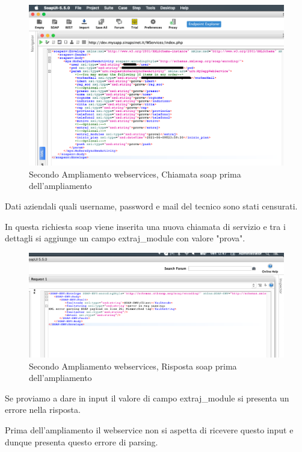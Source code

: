 \begin{figure}[!h] 
	\centering
	\includegraphics[scale = 0.5]{immagini/webservices/ampliamenti/accettazione/2ampl_soap_chiamata_premodifica.png}
	\caption{Secondo Ampliamento webservices, Chiamata  \gls{soap} prima dell'ampliamento}
\end{figure}
\begin{flushleft}
	Dati aziendali quali username, password e mail del tecnico sono stati censurati.
	
	In questa richiesta \gls{soap} viene inserita una nuova chiamata di servizio e tra i dettagli si aggiunge un campo extraj\_module con valore "prova".
\end{flushleft}
\begin{figure}[!h] 
	\centering
	\includegraphics[scale = 0.5]{immagini/webservices/ampliamenti/accettazione/2ampl_soap_risposta_premodifica.png}
	\caption{Secondo Ampliamento webservices, Risposta \gls{soap} prima dell'ampliamento}
\end{figure}
\begin{flushleft}
	Se proviamo a dare in input il valore di campo extraj\_module si presenta un errore nella risposta.
	
	Prima dell'ampliamento il webservice non si aspetta di ricevere questo input e dunque presenta questo errore di parsing.
\end{flushleft}
\newpage

